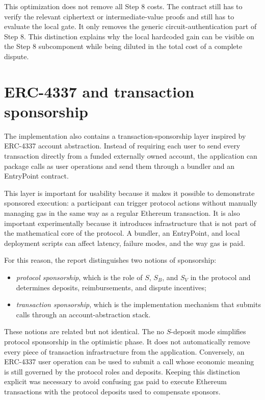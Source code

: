 This optimization does not remove all Step 8 costs. The contract still has to verify the
relevant ciphertext or intermediate-value proofs and still has to evaluate the local gate.
It only removes the generic circuit-authentication part of Step 8. This distinction explains
why the local hardcoded gain can be visible on the Step 8 subcomponent while being diluted in
the total cost of a complete dispute.

\section{ERC-4337 and transaction sponsorship}

The implementation also contains a transaction-sponsorship layer inspired by ERC-4337
account abstraction. Instead of requiring each user to send every transaction directly from a
funded externally owned account, the application can package calls as user operations and
send them through a bundler and an EntryPoint contract.

This layer is important for usability because it makes it possible to demonstrate sponsored
execution: a participant can trigger protocol actions without manually managing gas in the
same way as a regular Ethereum transaction. It is also important experimentally because it
introduces infrastructure that is not part of the mathematical core of the protocol. A
bundler, an EntryPoint, and local deployment scripts can affect latency, failure modes, and
the way gas is paid.

For this reason, the report distinguishes two notions of sponsorship:

\begin{itemize}
  \item \emph{protocol sponsorship}, which is the role of \(S\), \(S_B\), and \(S_V\) in the
  \sox{} protocol and determines deposits, reimbursements, and dispute incentives;
  \item \emph{transaction sponsorship}, which is the implementation mechanism that submits
  calls through an account-abstraction stack.
\end{itemize}

These notions are related but not identical. The no \(S\)-deposit mode simplifies protocol
sponsorship in the optimistic phase. It does not automatically remove every piece of
transaction infrastructure from the application. Conversely, an ERC-4337 user operation can
be used to submit a call whose economic meaning is still governed by the protocol roles and
deposits. Keeping this distinction explicit was necessary to avoid confusing gas paid to
execute Ethereum transactions with the protocol deposits used to compensate sponsors.

